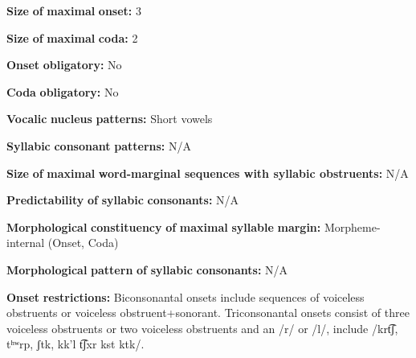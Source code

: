 \begin{styleBody}
\textbf{Size} \textbf{of} \textbf{maximal} \textbf{onset:} 3
\end{styleBody}

\begin{styleBody}
\textbf{Size} \textbf{of} \textbf{maximal} \textbf{coda:} 2
\end{styleBody}

\begin{styleBody}
\textbf{Onset} \textbf{obligatory:} No
\end{styleBody}

\begin{styleBody}
\textbf{Coda} \textbf{obligatory:} No
\end{styleBody}

\begin{styleBody}
\textbf{Vocalic} \textbf{nucleus} \textbf{patterns:} Short vowels
\end{styleBody}

\begin{styleBody}
\textbf{Syllabic} \textbf{consonant} \textbf{patterns:} N/A
\end{styleBody}

\begin{styleBody}
\textbf{Size} \textbf{of} \textbf{maximal} \textbf{word{}-marginal sequences with syllabic obstruents:} N/A
\end{styleBody}

\begin{styleBody}
\textbf{Predictability} \textbf{of} \textbf{syllabic} \textbf{consonants:} N/A
\end{styleBody}

\begin{styleBody}
\textbf{Morphological} \textbf{constituency} \textbf{of} \textbf{maximal} \textbf{syllable} \textbf{margin:} Morpheme-internal (Onset, Coda)
\end{styleBody}

\begin{styleBody}
\textbf{Morphological} \textbf{pattern} \textbf{of} \textbf{syllabic} \textbf{consonants:} N/A
\end{styleBody}

\begin{styleBody}
\textbf{Onset} \textbf{restrictions:} Biconsonantal onsets include sequences of voiceless obstruents or voiceless obstruent+sonorant. Triconsonantal onsets consist of three voiceless obstruents or two voiceless obstruents and an /r/ or /l/, include /krt͡ʃ, tʰʷrp, ʃtk, kk'l t͡ʃxr kst ktk/.
\end{styleBody}

